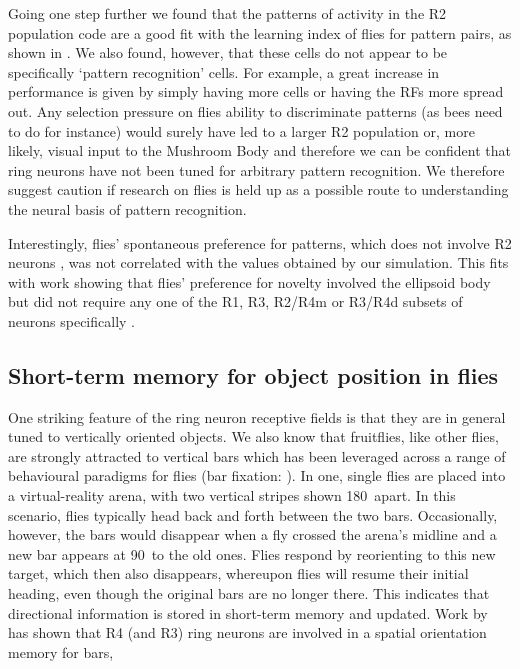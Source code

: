 \documentclass[10pt]{article}
\begin{document}
Going one step further we found that the patterns of activity in the R2 population code are a good fit with the learning index of flies for pattern pairs, as shown in \cite{Ernst1999}. We also found, however, that these cells do not appear to be specifically `pattern recognition' cells.
For example, a great increase in performance is given by simply having more cells or having the RFs more spread out. Any selection pressure on flies ability to discriminate patterns (as bees need to do for instance) would surely have led to a larger R2 population or, more likely, visual input to the Mushroom Body and therefore we can be confident that ring neurons have not been tuned for arbitrary pattern recognition. We therefore suggest caution if research on flies is held up as a possible route to understanding the neural basis of pattern recognition.

Interestingly, flies' spontaneous preference for patterns, which does not involve R2 neurons \cite{Ernst1999}, was not correlated with the values obtained by our simulation. This fits with work showing that flies' preference for novelty involved the ellipsoid body but did not require any one of the R1, R3, R2/R4m or R3/R4d subsets of neurons specifically \cite{Solanki2015}.

\subsection{Short-term memory for object position in flies}

One striking feature of the ring neuron receptive fields is that they are in general tuned to vertically oriented objects.
We also know that fruitflies, like other flies, are strongly attracted to vertical bars which has been leveraged across a range of behavioural paradigms for flies (bar fixation: \cite{Neuser2008}). In one, single flies are placed into a virtual-reality arena, with two vertical stripes shown 180\degree\ apart.
In this scenario, flies typically head back and forth between the two bars.
Occasionally, however, the bars would disappear when a fly crossed the arena's midline and a new bar appears at 90\degree\ to the old ones.
Flies respond by reorienting to this new target, which then also disappears, whereupon flies will resume their initial heading, even though the original bars are no longer there. This indicates that directional information is stored in short-term memory and updated. Work by \cite{Neuser2008} has shown that R4 (and R3) ring neurons are involved in a spatial orientation memory for bars, 
\end{document}
